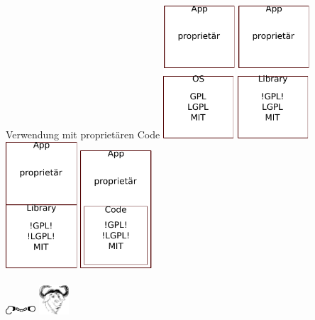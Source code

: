 \begin{frame}{Verwendung mit proprietären Code}
	\includegraphics[width=0.2\textwidth]{res/propritary-on-os.pdf}
	\hfill
	\includegraphics[width=0.2\textwidth]{res/propritary-dynamic-linking.pdf}
	\hfill
	\includegraphics[width=0.2\textwidth]{res/propritary-static-linking.pdf}
	\hfill
	\includegraphics[width=0.2\textwidth]{res/propritary-use-code.pdf}
	\\
	\\
	\includegraphics[width=3em]{res/open-handcuffs.pdf}
	\includegraphics[width=3em]{res/gnu-head.pdf}
\end{frame}
